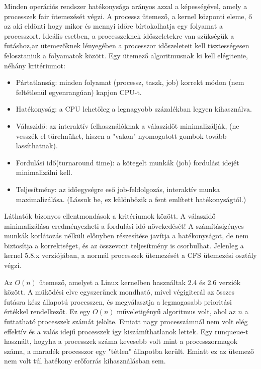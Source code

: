 

Minden operációs rendszer hatékonysága arányos azzal a képességével, amely a processzek fair ütemezését végzi. A processz ütemező, a kernel központi eleme, ő az aki eldönti hogy mikor és mennyi időre bírtokolhatja egy folyamat a processzort. Ideális esetben, a processzeknek időszeletekre van szükségük a futáshoz,az ütemezőknek lényegében a processzor időszeleteit kell tisztességesen felosztaniuk a folyamatok között.
Egy ütemező algoritmusnak ki kell elégitenie, néhány kritériumot:
\begin{itemize}
	\item Pártatlanság: minden folyamat (processz, taszk, job) korrekt módon (nem feltétlenül egyenrangúan) kapjon CPU-t.
	\item Hatékonyság: a CPU lehetőleg a legnagyobb százalékban legyen kihasználva.
	\item Válaszidő: az interaktív felhasználóknak a válaszidőt minimalizálják, (ne vesszék el türelmüket, hiszen a "vakon" nyomogatott gombok tovább lassíthatnak).
	\item Fordulási idő(turnaround time): a kötegelt munkák (job) fordulási idejét minimalizálni
kell.
	\item Teljesítmény: az időegységre eső job-feldolgozás, interaktív munka maximalizálása.
(Lássuk be, ez különbözik a fent említett hatékonyságtól.)
\end{itemize}
Láthatók bizonyos ellentmondások a kritériumok között. A válaszidő minimalizálása eredményezheti a fordulási idő növekedését!
A számításigényes munkák korlátozás nélküli
előnyben részesítése javítja a hatékonyságot, de nem biztosítja a korrektséget, és az összevont
teljesítmény is csorbulhat.
Jelenleg a kernel 5.8.x verziójában, a normál processzek ütemezését a CFS ütemezési osztály végzi. 


Az $O(n)$ ütemező, amelyet a Linux kernelben használtak 2.4 és 2.6 verziók között. A müködési elve egyszerűnek mondható, mivel végigiterál az összes futásra kész állapotú processzen, és megválasztja a legmagasabb prioritási értékkel rendelkezőt.
Ez egy $O(n)$ műveletigényű algoritmus volt, ahol az $n$ a futtatható processzek számát jelölte. Emiatt nagy processzámnál nem volt elég effektív és a valós idejű processzek így kiszámíthatlanok lettek.
Egy runqueue-t használt, hogyha a processzek száma kevesebb volt mint a processzormagok száma, a maradék processzor egy "tétlen" állapotba került. Emiatt ez az ütemező nem volt túl hatékony erőforrás kihasználásban sem.

